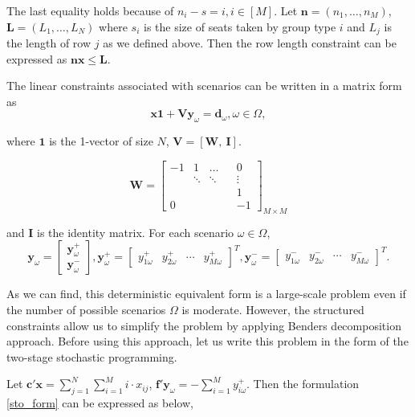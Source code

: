 
The last equality holds because of $n_i-s = i, i \in [M]$. 
Let $\mathbf{n} = (n_1, \ldots, n_M)$, $\mathbf{L} = (L_1, \ldots, L_N)$ where $s_i$ is the size of seats taken by group type $i$ and $L_j$ is the length of row $j$ as we defined above. Then the row length constraint can be expressed as $\mathbf{n} \mathbf{x} \leq \mathbf{L}$.

The linear constraints associated with scenarios can be written in a matrix form as
\[\mathbf{x} \mathbf{1} + \mathbf{V} \mathbf{y}_\omega = \mathbf{d}_\omega, \omega\in \Omega,\]

where $\mathbf{1}$ is the 1-vector of size $N$, $\mathbf{V} = [\mathbf{W}, ~\mathbf{I}]$.  

$$
\mathbf{W}=\left[\begin{array}{ccccc}
-1 & 1 & \ldots & & 0 \\
& \ddots & \ddots & & \vdots \\
& & & & 1 \\
0 & & & & -1
\end{array}\right]_{M \times M}
$$

and $\mathbf{I}$ is the identity matrix. For each scenario $\omega \in \Omega$,
$$
\mathbf{y}_{\omega}=\left[\begin{array}{l}
\mathbf{y}_{\omega}^{+} \\
\mathbf{y}_{\omega}^{-}
\end{array}\right], \mathbf{y}_{\omega}^{+}=\left[\begin{array}{lllll}y_{1 \omega}^{+} & y_{2 \omega}^{+} & \cdots & y_{M \omega}^{+}\end{array}\right]^{T}, \mathbf{y}_{\omega}^{-}=\left[\begin{array}{llll}y_{1 \omega}^{-} & y_{2 \omega}^{-} & \cdots & y_{M \omega}^{-}\end{array}\right]^{T}.
$$

As we can find, this deterministic equivalent form is a large-scale problem even if the number of possible scenarios $\Omega$ is moderate. However, the structured constraints allow us to simplify the problem by applying Benders decomposition approach. Before using this approach, let us write this problem in the form of the two-stage stochastic programming.

Let $\mathbf{c}{'}\mathbf{x} = \sum_{j =1}^{N} \sum_{i=1}^M i \cdot x_{ij}$, $\mathbf{f}{'}\mathbf{y}_{\omega} = -\sum_{i=1}^{M} y_{i \omega}^{+}$. Then the formulation \eqref{sto_form} can be expressed as below,

